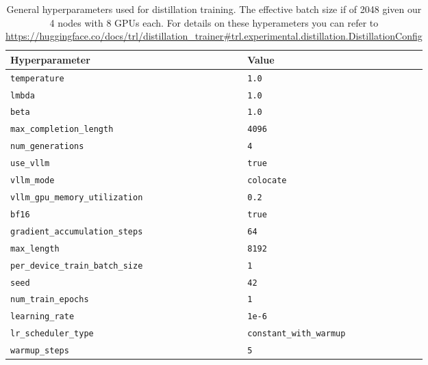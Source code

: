 \begin{table}[htbp]
    \centering
    \small
    \begin{tabular}{ll}
        \toprule
        Hyperparameter & Value \\
        \midrule
        \texttt{temperature} & \texttt{1.0} \\
        \texttt{lmbda} & \texttt{1.0} \\
        \texttt{beta} & \texttt{1.0} \\
        \texttt{max\_completion\_length} & \texttt{4096} \\
        \texttt{num\_generations} & \texttt{4} \\
        \texttt{use\_vllm} & \texttt{true} \\
        \texttt{vllm\_mode} & \texttt{colocate} \\
        \texttt{vllm\_gpu\_memory\_utilization} & \texttt{0.2} \\
        \texttt{bf16} & \texttt{true} \\
        \texttt{gradient\_accumulation\_steps} & \texttt{64} \\
        \texttt{max\_length} & \texttt{8192} \\
        \texttt{per\_device\_train\_batch\_size} & \texttt{1} \\
        \texttt{seed} & \texttt{42} \\
        \texttt{num\_train\_epochs} & \texttt{1} \\
        \texttt{learning\_rate} & \texttt{1e-6} \\
        \texttt{lr\_scheduler\_type} & \texttt{constant\_with\_warmup} \\
        \texttt{warmup\_steps} & \texttt{5} \\
        \bottomrule
    \end{tabular}
    \caption{General hyperparameters used for distillation training. The effective batch size if of 2048 given our 4 nodes with 8 GPUs each. For details on these hyperameters you can refer to \protect\url{https://huggingface.co/docs/trl/distillation_trainer\#trl.experimental.distillation.DistillationConfig}}
    \label{tab:distillation_hyperparameters}
\end{table}

